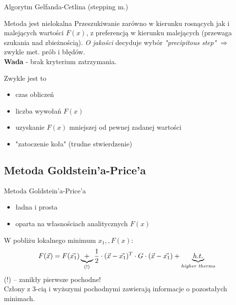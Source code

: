   \begin{frame}{Algorytm Gelfanda-Cetlina (stepping m.)}
    \begin{block}{Metoda jest nielokalna}
      Przeszukiwanie zarówno w kierunku rosnących jak i
      malejących wartości $F(x)$, z preferencją w kierunku
      malejących (przewaga szukania nad zbieżnością).
      \emph{O jakości} decyduje wybór \emph{"precipitous step"}
      $\Rightarrow$ zwykle met. prób i błędów.\\
      \textbf{Wada} - brak kryterium zatrzymania.
    \end{block}

    \begin{block}{Zwykle jest to}
      \begin{itemize}
        \item czas obliczeń
        \item liczba wywołań $F(x)$
        \item uzyskanie $F(x)$ mniejszej od pewnej zadanej
        wartości
        \item "zatoczenie koła" (trudne stwierdzenie)
      \end{itemize}
    \end{block}
  \end{frame}

  \subsection{Metoda Goldstein'a-Price'a}

  \begin{frame}{Metoda Goldstein'a-Price'a}
    \begin{itemize}
      \item ładna i prosta
      \item oparta na własnościach analitycznych $F(x)$
    \end{itemize}
    W pobliżu lokalnego minimum $x_{1}{,}, F(x)$:
    \begin{displaymath}
      F(\vec{x})=F(\vec{x_{1}}) \underbrace{+}_{(!)}
      \frac{1}{2} \cdot (\vec{x} - \vec{x_{1}})^T \cdot
      G \cdot (\vec{x} - \vec{x_{1}}) +
      \underbrace{h.t.}_{\text{\emph{higher therms}}}
    \end{displaymath}
    (!) -- zanikły pierwsze pochodne!\\
    Człony z 3-cią i wyższymi pochodnymi zawierają informacje
    o pozostałych minimach.
  \end{frame}

